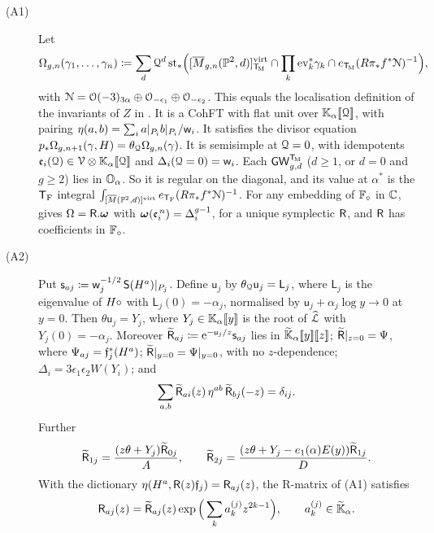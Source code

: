 \begin{thm}
\label{thm:gen-main}
\begin{description}
\item[(A1)] Let
\[
\Omega_{g,n}(\gamma_1,\dots,\gamma_n)\coloneqq\sum_{d}\mathcal{Q}^d\,\mathrm{st}_*\Big([\overline{M}_{g,n}(\mathbb{P}^2,d)]^{\mathrm{virt}}_{\mathsf{T}_{\!\mathrm{M}}}\cap\prod_k\mathrm{ev}_k^*\gamma_k\cap e_{\mathsf{T}_{\!\mathrm{M}}}(R\pi_*f^*\mathcal{N})^{-1}\Big),
\]
with $\mathcal{N}=\mathcal{O}(-3)_{3\alpha}\oplus\mathcal{O}_{-\epsilon_1}\oplus\mathcal{O}_{-\epsilon_2}$. This equals the localisation definition of the invariants of $Z$ in \cite{BS}. It is a CohFT with flat unit over $\mathbb{K}_{\alpha}[\![ \mathcal{Q} ]\!]$, with pairing $\eta(a,b)=\sum_i a|_{P_i}b|_{P_i}/\mathsf{w}_i$. It satisfies the divisor equation $p_*\Omega_{g,n+1}(\gamma,H)=\theta_{\mathcal{Q}}\Omega_{g,n}(\gamma)$. It is semisimple at $\mathcal{Q}=0$, with idempotents $\mathfrak{e}_i(\mathcal{Q})\in\mathcal{V}\otimes\mathbb{K}_{\alpha}[\![ \mathcal{Q} ]\!]$ and $\Delta_i(\mathcal{Q}=0)=\mathsf{w}_i$. Each $\mathsf{GW}_{g,d}^{\mathsf{T}_{\!\mathrm{M}}}$ ($d\geq 1$, or $d=0$ and $g\geq 2$) lies in $\mathbb{O}_{\alpha}$. So it is regular on the diagonal, and its value at $\alpha^*$ is the $\mathsf{T}_{\mathrm{F}}$ integral $\int_{[\overline{M}(\mathbb{P}^2,d)]^{\mathrm{virt}}}e_{\mathsf{T}_{\mathrm{F}}}(R\pi_*f^*\mathcal{N})^{-1}$. For any embedding of $\mathbb{F}_{\circ}$ in $\mathbb{C}$, \cite[Theorem (2)]{Tel12} gives $\Omega=\mathsf{R}.\boldsymbol{\omega}$ with $\boldsymbol{\omega}(\mathfrak{e}_i^{\,n})=\Delta_i^{g-1}$, for a unique symplectic $\mathsf{R}$, and $\mathsf{R}$ has coefficients in $\mathbb{F}_{\circ}$.

\item[(A2)] Put $\mathsf{s}_{aj}\coloneqq\mathsf{w}_j^{-1/2}\,\mathsf{S}(H^a)|_{P_j}$. Define $\mathsf{u}_j$ by $\theta_{\mathcal{Q}}\mathsf{u}_j=\mathsf{L}_j$, where $\mathsf{L}_j$ is the eigenvalue of $H\circ$ with $\mathsf{L}_j(0)=-\alpha_j$, normalised by $\mathsf{u}_j+\alpha_j\log y\to 0$ at $y=0$. Then $\theta\mathsf{u}_j=Y_j$, where $Y_j\in\mathbb{K}_{\alpha}[\![ y ]\!]$ is the root of $\widehat{\mathcal{L}}$ with $Y_j(0)=-\alpha_j$. Moreover $\widetilde{\mathsf{R}}_{aj}\coloneqq\mathrm{e}^{-\mathsf{u}_j/z}\mathsf{s}_{aj}$ lies in $\widetilde{\mathbb{K}}_{\alpha}[\![ y ]\!][\![ z ]\!]$; $\widetilde{\mathsf{R}}|_{z=0}=\Psi$, where $\Psi_{aj}=\mathfrak{f}_j^*(H^a)$; $\widetilde{\mathsf{R}}|_{y=0}=\Psi|_{y=0}$, with no $z$-dependence; $\Delta_i=3\epsilon_1\epsilon_2W(Y_i)$; and
\[
\sum_{a,b}\widetilde{\mathsf{R}}_{ai}(z)\,\eta^{ab}\,\widetilde{\mathsf{R}}_{bj}(-z)=\delta_{ij}.
\]
Further
\begin{equation}
\widetilde{\mathsf{R}}_{1j}=\frac{(z\theta+Y_j)\widetilde{\mathsf{R}}_{0j}}{A},\qquad \widetilde{\mathsf{R}}_{2j}=\frac{(z\theta+Y_j-e_1(\alpha)E(y))\widetilde{\mathsf{R}}_{1j}}{D}.
\label{eq:gen-rowrec}
\end{equation}
With the dictionary $\eta(H^a,\mathsf{R}(z)\mathfrak{f}_j)=\mathsf{R}_{aj}(z)$, the R-matrix of (A1) satisfies
\[
\mathsf{R}_{aj}(z)=\widetilde{\mathsf{R}}_{aj}(z)\exp\Big(\sum_k a_k^{(j)}z^{2k-1}\Big),\qquad a_k^{(j)}\in\widetilde{\mathbb{K}}_{\alpha}.
\]


\end{description}
\end{thm}

